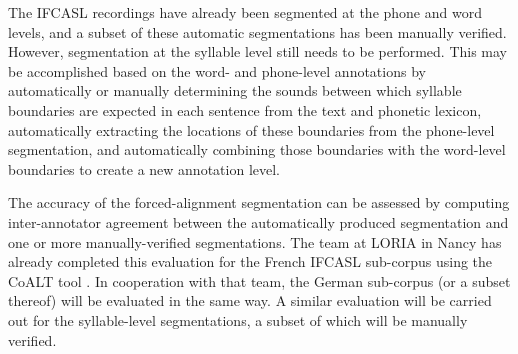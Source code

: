 	
	The IFCASL recordings have already been segmented at the phone and word levels, and a subset of these automatic segmentations has been manually verified. However, segmentation at the syllable level still needs to be performed. This may be accomplished based on the word- and phone-level annotations by automatically or manually determining the sounds between which syllable boundaries are expected in each sentence from the text and phonetic lexicon, automatically extracting the locations of these boundaries from the phone-level segmentation, and automatically combining those boundaries with the word-level boundaries to create a new annotation level. 
	
	
	
	The accuracy of the forced-alignment segmentation can be assessed by computing inter-annotator agreement between the automatically produced segmentation and one or more manually-verified segmentations. The team at LORIA in Nancy has already completed this evaluation for the French IFCASL sub-corpus using the CoALT tool \citep{Fohr2012}. In cooperation with that team, the German sub-corpus (or a subset thereof) will be evaluated in the same way.
	A similar evaluation will be carried out for the syllable-level segmentations, a subset of which will be manually verified.


